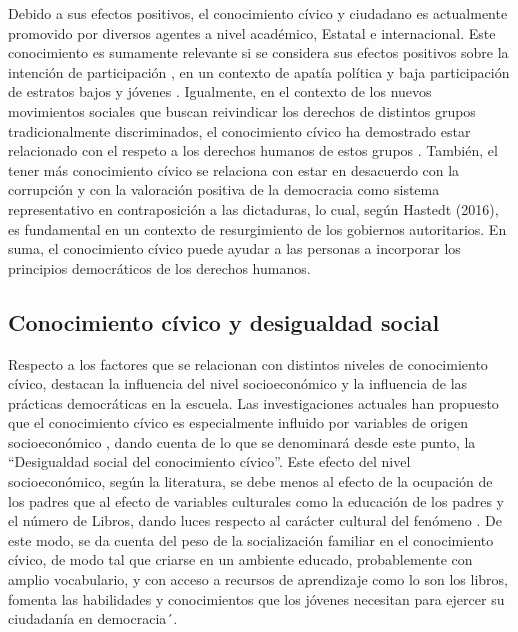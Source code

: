 \documentclass[12pt,twoside]{templates/facsothesis}
\begin{document}
Debido a sus efectos positivos, el conocimiento cívico y ciudadano es actualmente promovido por diversos agentes a nivel académico, Estatal e internacional. Este conocimiento es sumamente relevante si se considera sus efectos positivos sobre la intención de participación \citep{miranda_Desigualdad_2015}, en un contexto de apatía política y baja participación de estratos bajos y jóvenes \citep{janmaat_Civic_2013, contreras_DIFERENCIAS_2013}. Igualmente, en el contexto de los nuevos movimientos sociales que buscan reivindicar los derechos de distintos grupos tradicionalmente discriminados, el conocimiento cívico ha demostrado estar relacionado con el respeto a los derechos humanos de estos grupos \citep{miranda_Political_2018, caro_Ten_2012}. También, el tener más conocimiento cívico se relaciona con estar en desacuerdo con la corrupción y con la valoración positiva de la democracia como sistema representativo en contraposición a las dictaduras, lo cual, según Hastedt (2016), es fundamental en un contexto de resurgimiento de los gobiernos autoritarios. En suma, el conocimiento cívico puede ayudar a las personas a incorporar los principios democráticos de los derechos humanos.

\hypertarget{conocimiento-cuxedvico-y-desigualdad-social}{%
\subsection{Conocimiento cívico y desigualdad social}\label{conocimiento-cuxedvico-y-desigualdad-social}}

Respecto a los factores que se relacionan con distintos niveles de conocimiento cívico, destacan la influencia del nivel socioeconómico y la influencia de las prácticas democráticas en la escuela. Las investigaciones actuales han propuesto que el conocimiento cívico es especialmente influido por variables de origen socioeconómico \citep{ace_Estudio_2017, schulz_Estudio_2011, ferrans_Civic_2017, trevino_Influence_2017}, dando cuenta de lo que se denominará desde este punto, la ``Desigualdad social del conocimiento cívico''. Este efecto del nivel socioeconómico, según la literatura, se debe menos al efecto de la ocupación de los padres que al efecto de variables culturales como la educación de los padres y el número de Libros, dando luces respecto al carácter cultural del fenómeno \citep{castillo_Social_2014}. De este modo, se da cuenta del peso de la socialización familiar en el conocimiento cívico, de modo tal que criarse en un ambiente educado, probablemente con amplio vocabulario, y con acceso a recursos de aprendizaje como lo son los libros, fomenta las habilidades y conocimientos que los jóvenes necesitan para ejercer su ciudadanía en democracia´.
\end{document}
